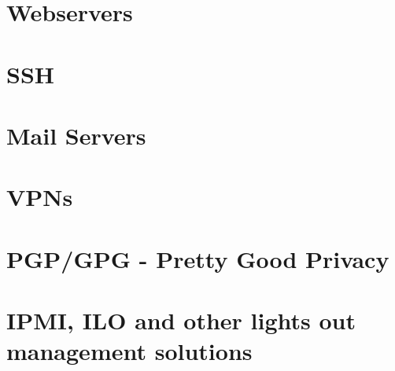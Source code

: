 
\label{section:PracticalSettings}

\section{Webservers}


\section{SSH}


\section{Mail Servers}



\section{VPNs}



\section{PGP/GPG - Pretty Good Privacy}



%


\section{IPMI, ILO and other lights out management solutions}





